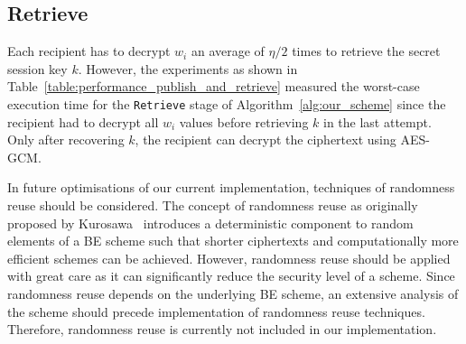 \subsection{Retrieve}
Each recipient has to decrypt $w_i$ an average of $\eta/2$ times to retrieve the secret session key $k$. However, the experiments as shown in Table~\ref{table:performance_publish_and_retrieve} measured the worst-case execution time for the \texttt{Retrieve} stage of Algorithm~\ref{alg:our_scheme} since the recipient had to decrypt all $w_i$ values before retrieving $k$ in the last attempt. Only after recovering $k$, the recipient can decrypt the ciphertext using AES-GCM.

In future optimisations of our current implementation, techniques of randomness reuse should be considered. The concept of randomness reuse as originally proposed by Kurosawa~\cite{art:Kurosawa01} introduces a deterministic component to random elements of a BE scheme such that shorter ciphertexts and computationally more efficient schemes can be achieved. However, randomness reuse should be applied with great care as it can significantly reduce the security level of a scheme. Since randomness reuse depends on the underlying BE scheme, an extensive analysis of the scheme should precede implementation of randomness reuse techniques. Therefore, randomness reuse is currently not included in our implementation.

